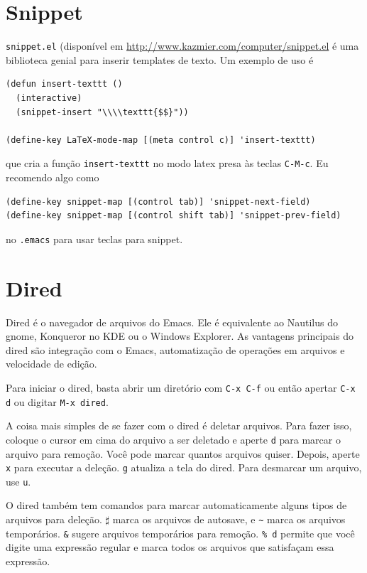 \documentclass[12pt,brazil]{book}
\begin{document}
\section{Snippet}
\label{sec:snippet}

\texttt{snippet.el} (disponível em
\url{http://www.kazmier.com/computer/snippet.el} é uma biblioteca
genial para inserir templates de texto. Um exemplo de uso é

\begin{verbatim}
(defun insert-texttt ()
  (interactive)
  (snippet-insert "\\\\texttt{$$}"))

(define-key LaTeX-mode-map [(meta control c)] 'insert-texttt)

\end{verbatim}

que cria a função \texttt{insert-texttt} no modo latex presa às teclas
\texttt{C-M-c}. Eu recomendo algo como

\begin{verbatim}
(define-key snippet-map [(control tab)] 'snippet-next-field)
(define-key snippet-map [(control shift tab)] 'snippet-prev-field)
\end{verbatim}

no \texttt{.emacs} para usar teclas para snippet.

\section{Dired}
\label{sec:dired}

Dired é o navegador de arquivos do Emacs. Ele é equivalente ao
Nautilus do gnome, Konqueror no KDE ou o Windows Explorer. As
vantagens principais do dired são integração com o Emacs,
automatização de operações em arquivos e velocidade de edição.

Para iniciar o dired, basta abrir um diretório com \texttt{C-x C-f} ou
então apertar \texttt{C-x d} ou digitar \texttt{M-x dired}.

A coisa mais simples de se fazer com o dired é deletar arquivos. Para
fazer isso, coloque o cursor em cima do arquivo a ser deletado e aperte
\texttt{d} para marcar o arquivo para remoção. Você pode marcar
quantos arquivos quiser. Depois, aperte \texttt{x} para executar a
deleção. \texttt{g} atualiza a tela do dired. Para desmarcar um
arquivo, use \texttt{u}.

O dired também tem comandos para marcar automaticamente alguns
tipos de arquivos para deleção. \texttt{$\sharp$} marca os arquivos de
autosave, e \texttt{\~} marca os arquivos temporários. \texttt{\&}
sugere arquivos temporários para remoção. \texttt{\% d} permite que você
digite uma expressão regular e marca todos os arquivos que satisfaçam
essa expressão.
\end{document}
